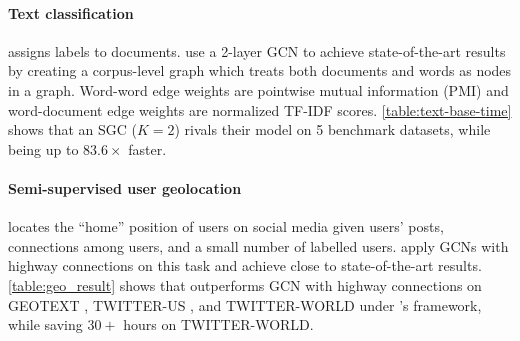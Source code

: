 \paragraph{Text classification} assigns labels to documents. 
\citet{textGCN} use a 2-layer GCN to achieve state-of-the-art results by creating a corpus-level graph which treats both documents and words as nodes in a graph. 
Word-word edge weights are pointwise mutual information (PMI) and word-document edge weights are normalized TF-IDF scores. 
\autoref{table:text-base-time} shows that an SGC ($K=2$) rivals their model on 5 benchmark datasets, while being up to $83.6\times$ faster.
%
\begin{table}[t!]
\centering
\small
\caption{Test accuracy (\%) within 161 miles on semi-supervised user geolocation. The numbers are averaged over 5 runs.}
\label{table:geo_result}
\end{table}

\paragraph{Semi-supervised user geolocation} locates the ``home'' position of users on social media given users' posts, connections among users, and a small number of labelled users. \citet{Rahimi18} apply GCNs with highway connections on this task and achieve close to state-of-the-art results.
\autoref{table:geo_result} shows that \method{} outperforms GCN with highway connections on GEOTEXT \citep{eisenstein2010latent}, TWITTER-US \citep{roller2012supervised}, and TWITTER-WORLD \citep{han2012geolocation} under \citet{Rahimi18}'s framework, while saving $30+$ hours on TWITTER-WORLD.

